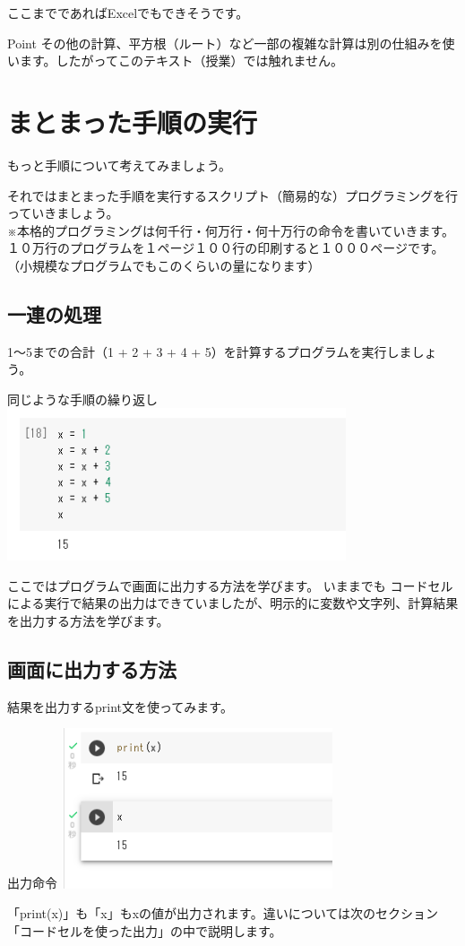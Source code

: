 \documentclass[11pt,a4paper,dvipdfmx,titlepage]{jsreport}
\begin{document}
ここまでであればExcelでもできそうです。
\begin{hipoint}{Point}
 その他の計算、平方根（ルート）など一部の複雑な計算は別の仕組みを使います。したがってこのテキスト（授業）では触れません。
\end{hipoint}


\section{まとまった手順の実行}
もっと手順について考えてみましょう。

それではまとまった手順を実行するスクリプト（簡易的な）プログラミングを行っていきましょう。\\

※本格的プログラミングは何千行・何万行・何十万行の命令を書いていきます。\\
１０万行のプログラムを１ページ１００行の印刷すると１０００ページです。（小規模なプログラムでもこのくらいの量になります）

\subsection{一連の処理}
1～5までの合計（1 + 2 + 3 + 4 + 5）を計算するプログラムを実行しましょう。

\begin{grabox}{同じような手順の繰り返し}
\includegraphics[width=10cm]{images/colab09-1.png}
\end{grabox}

ここではプログラムで画面に出力する方法を学びます。
いままでも {\gt コードセルによる実行}で結果の出力はできていましたが、明示的に変数や文字列、計算結果を出力する方法を学びます。


\subsection{画面に出力する方法}
結果を出力するprint文を使ってみます。
\begin{grabox}{出力命令}
\includegraphics[width=8cm]{images/colab10.png}
\end{grabox}
「print(x)」も「x」もxの値が出力されます。違いについては次のセクション「コードセルを使った出力」の中で説明します。
\end{document}
